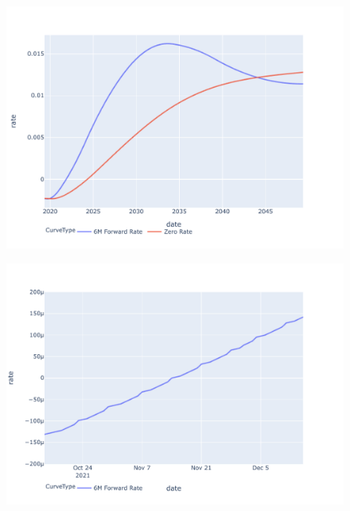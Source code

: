\documentclass[../Thesis_AHoecherl.tex]{subfiles}
\begin{document}




\begin{figure}
	\centering
	\includegraphics[scale=0.95]{../Graphics/euribor6m_termstructure.pdf}
    \caption{}
\end{figure}

\begin{figure}
	\centering
	\includegraphics[scale=0.95]{../Graphics/euribor6m_termstructure_crossing_zero.pdf}
    \caption{}
\end{figure}






\end{document}
